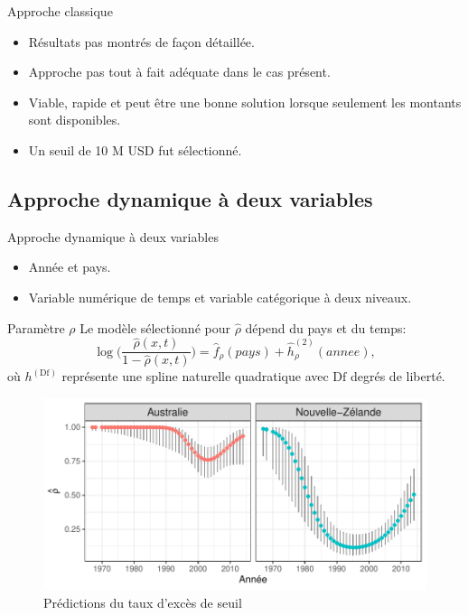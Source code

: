 \begin{frame}{Approche classique}
\begin{itemize}
\item Résultats pas montrés de façon détaillée. \pause
\item Approche pas tout à fait adéquate dans le cas présent. \pause
\item Viable, rapide et peut être une bonne solution lorsque seulement les montants sont disponibles. \pause
\item Un seuil de 10 M USD fut sélectionné.
\end{itemize}
\end{frame}

\subsection{Approche dynamique à deux variables}

\begin{frame}{Approche dynamique à deux variables}
\begin{itemize}
\item Année et pays. \pause
\item Variable numérique de temps et variable catégorique à deux niveaux.
\end{itemize}
\end{frame}

\begin{frame}{Paramètre $\rho$}
Le modèle sélectionné pour $\hat\rho$ dépend du pays et du temps:
\begin{equation*}
\log\Bigg(\frac{\hat\rho(x,t)}{1-\hat\rho(x,t)}\Bigg) = \hat{f}_\rho(pays) + \hat{h}^{(2)}_\rho(annee),
\end{equation*}
où ${h}^{(\text{Df})}$ représente une spline naturelle quadratique avec $\text{Df}$ degrés de liberté.
\end{frame}

\begin{frame}
\begin{figure}
\includegraphics[width=.8\textwidth]{images/fig-013.pdf}
\caption{Prédictions du taux d'excès de seuil}
\end{figure}
\end{frame}


